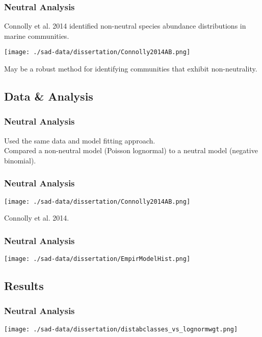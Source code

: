 \documentclass[14pt]{beamer}
\begin{document}
\begin{frame}
\frametitle{Neutral Analysis}
Connolly et al. 2014 identified non-neutral species abundance distributions in marine communities.\\
\begin{center}
\texttt{[image: ./sad-data/dissertation/Connolly2014AB.png]}
\end{center}
May be a robust method for identifying communities that exhibit non-neutrality.\\
\end{frame}

\subsection{Data & Analysis}
\begin{frame}
\frametitle{Neutral Analysis}
Used the same data and model fitting approach.\\
Compared a non-neutral model (Poisson lognormal) to a neutral model (negative binomial).\\
\end{frame}

\begin{frame}{}
\frametitle{Neutral Analysis}
\texttt{[image: ./sad-data/dissertation/Connolly2014AB.png]}
\begin{tiny}
Connolly et al. 2014.
\end{tiny}
\end{frame}

\begin{frame}{}
\frametitle{Neutral Analysis}
\texttt{[image: ./sad-data/dissertation/EmpirModelHist.png]}
\end{frame}

\subsection{Results}
\begin{frame}{}
\frametitle{Neutral Analysis}
\texttt{[image: ./sad-data/dissertation/distabclasses\_vs\_lognormwgt.png]}
\end{frame}
\end{document}

